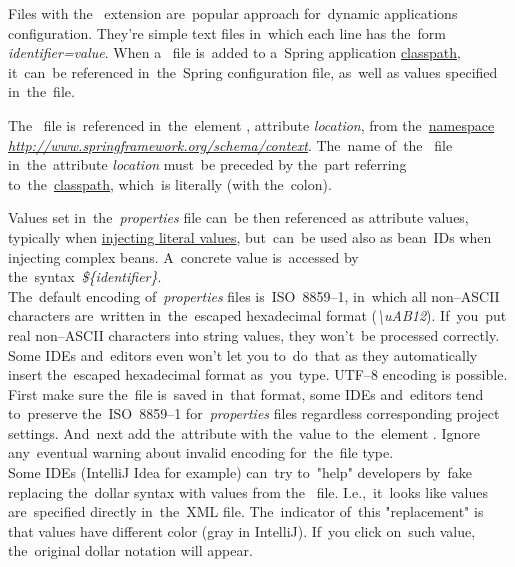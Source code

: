 \label{properties}
Files with the~ extension are~popular approach for~dynamic applications configuration.
They're simple text files in~which each line has the~form \textit{identifier=value}.
When a~ file is~added to a~Spring application \hyperref[classpath]{classpath}, it~can~be referenced in~the~Spring configuration file, as~well as values specified in~the~file.

The~ file is~referenced in~the~element , attribute \textit{location}, from the~\hyperref[namespaces]{namespace} \textit{\href{http://www.springframework.org/schema/context}{http://www.springframework.org/schema/context}}.
The~name of~the~ file in~the~attribute \textit{location} must~be preceded by the~part referring to~the~\hyperref[classpath]{classpath}, which~is literally  (with the~colon).

Values set in~the~\textit{properties} file can~be then referenced as attribute values, typically when \hyperref[injectingliteralvalues]{injecting literal values}, but~can~be used also as bean~IDs when injecting complex beans.
A~concrete value is~accessed by the~syntax~\textit{\$\{identifier\}}.\\

\warning The~default encoding of~\textit{properties} files is~\mbox{ISO~8859--1}, in~which all non--ASCII characters are~written in~the~escaped hexadecimal format (\textit{\textbackslash uAB12}).
If~you~put real non--ASCII characters into string values, they won't~be processed correctly.
Some IDEs and~editors even won't let you to~do~that as they automatically insert the~escaped hexadecimal format as~you~type.
UTF--8 encoding is possible.
First make sure the~file is~saved in~that format, some IDEs and~editors tend to~preserve the~\mbox{ISO~8859--1} for~\textit{properties} files regardless corresponding project settings.
And~next add the~attribute  with the~value  to~the~element .
Ignore any~eventual warning about invalid encoding for~the~file type.\\

\warning Some IDEs (IntelliJ Idea for example) can~try to~"help" developers by~fake replacing the~dollar syntax with values from the~ file.
I.e.,~it~looks like values are~specified directly in~the~XML file.
The~indicator of~this "replacement" is that values have different color (gray in IntelliJ).
If~you click on~such value, the~original dollar notation will appear.

